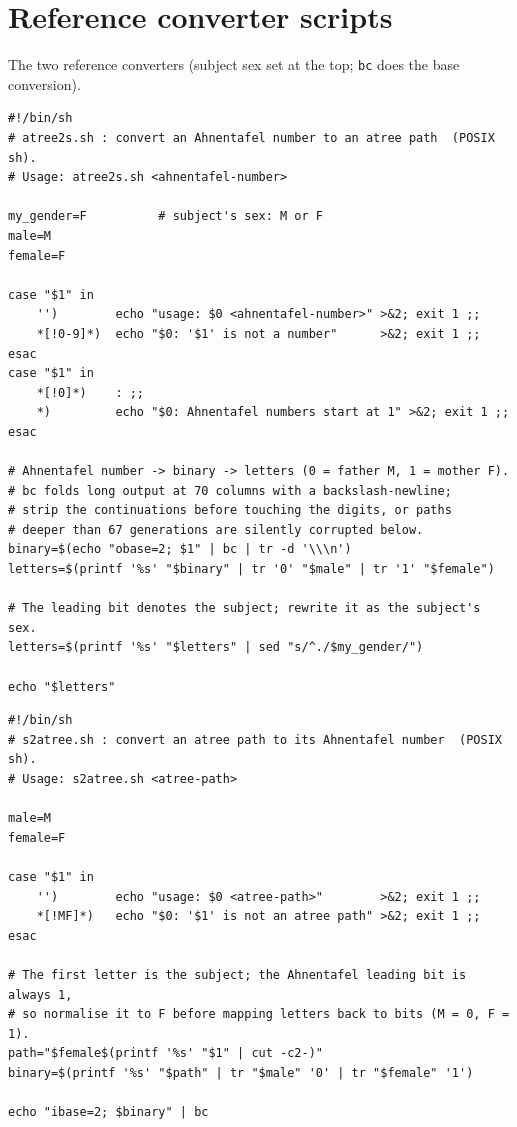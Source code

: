 \documentclass[11pt]{article}
\begin{document}
\section{Reference converter scripts}
\label{app:scripts}
The two reference converters (subject sex set at the top; \texttt{bc} does the base conversion).

\begin{verbatim}
#!/bin/sh
# atree2s.sh : convert an Ahnentafel number to an atree path  (POSIX sh).
# Usage: atree2s.sh <ahnentafel-number>

my_gender=F          # subject's sex: M or F
male=M
female=F

case "$1" in
    '')        echo "usage: $0 <ahnentafel-number>" >&2; exit 1 ;;
    *[!0-9]*)  echo "$0: '$1' is not a number"      >&2; exit 1 ;;
esac
case "$1" in
    *[!0]*)    : ;;
    *)         echo "$0: Ahnentafel numbers start at 1" >&2; exit 1 ;;
esac

# Ahnentafel number -> binary -> letters (0 = father M, 1 = mother F).
# bc folds long output at 70 columns with a backslash-newline;
# strip the continuations before touching the digits, or paths
# deeper than 67 generations are silently corrupted below.
binary=$(echo "obase=2; $1" | bc | tr -d '\\\n')
letters=$(printf '%s' "$binary" | tr '0' "$male" | tr '1' "$female")

# The leading bit denotes the subject; rewrite it as the subject's sex.
letters=$(printf '%s' "$letters" | sed "s/^./$my_gender/")

echo "$letters"
\end{verbatim}

\begin{verbatim}
#!/bin/sh
# s2atree.sh : convert an atree path to its Ahnentafel number  (POSIX sh).
# Usage: s2atree.sh <atree-path>

male=M
female=F

case "$1" in
    '')        echo "usage: $0 <atree-path>"        >&2; exit 1 ;;
    *[!MF]*)   echo "$0: '$1' is not an atree path" >&2; exit 1 ;;
esac

# The first letter is the subject; the Ahnentafel leading bit is always 1,
# so normalise it to F before mapping letters back to bits (M = 0, F = 1).
path="$female$(printf '%s' "$1" | cut -c2-)"
binary=$(printf '%s' "$path" | tr "$male" '0' | tr "$female" '1')

echo "ibase=2; $binary" | bc
\end{verbatim}

\printbibliography
\end{document}
